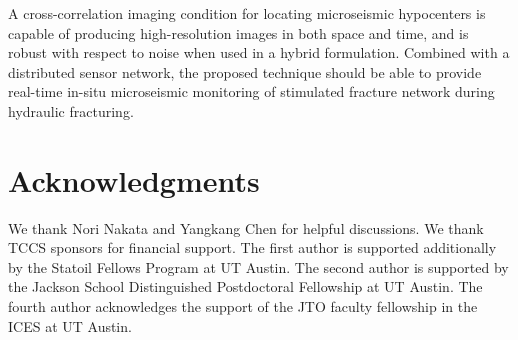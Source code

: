 A cross-correlation imaging condition for locating microseismic hypocenters is capable of producing high-resolution images in both space and time, and is robust with respect to noise when used in a hybrid formulation. Combined with a distributed sensor network, the proposed technique should be able to provide real-time in-situ microseismic monitoring of stimulated fracture network during hydraulic fracturing.

\section{Acknowledgments}
We thank Nori Nakata and Yangkang Chen for helpful discussions. We thank TCCS sponsors for financial support. The first author is supported additionally by the Statoil Fellows Program at UT Austin. The second author is supported by the Jackson School Distinguished Postdoctoral Fellowship at UT Austin. The fourth author acknowledges the support of the JTO faculty fellowship in the ICES at UT Austin.

\onecolumn




